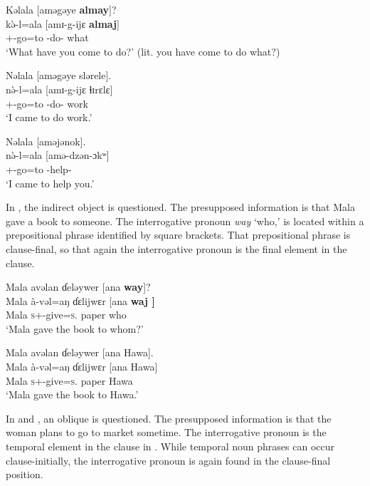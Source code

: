 \ea \label{ex:10:57}
Kəlala  [aməgəye  \textbf{almay}]?\\
\gll  k\`{ə}-l=ala   [amɪ-g-ijɛ   \textbf{almaj}]\\
      {\twoS}+{\PFV}-go=to  {\DEP}-do-{\CL}  what\\
\glt  ‘What have you come to do?’ (lit. you have come to do what?)
\z

\ea \label{ex:10:58}
Nəlala  [aməgəye  slərele].\\
\gll  n\`{ə}-l=ala     [amɪ-g-ijɛ   ɬɪrɛlɛ]\\
      {\oneS}+{\PFV}-go=to  {\DEP}-do{}-{\CL}  work\\
\glt  ‘I came to do work.’ 
\z

\clearpage
\ea \label{ex:10:59}
Nəlala  [aməjənok].\\
\gll  n\`{ə}-l=ala     [amə-dzən-ɔkʷ]\\
      {\oneS}+{\PFV}-go=to  {\DEP}-help-{\twoS}\\
\glt  ‘I came to help you.’ 
\z

In , the indirect object is questioned. The presupposed information is that Mala gave a book to someone. The interrogative pronoun \textit{way} ‘who,’ is located within a prepositional phrase identified by square brackets.  That prepositional phrase is clause-final, so that again the interrogative pronoun is the final element in the clause. 

\ea \label{ex:10:60}
Mala  avəlan  ɗeləywer  [ana  \textbf{way}]?\\
\gll  Mala   à-vəl=aŋ     ɗɛlijwɛr     [ana   \textbf{waj ]}\\
      Mala  \textsc{s}+{\PFV}-give=\textsc{s}.{\IO}  paper    {\DAT} who\\
\glt  ‘Mala gave the book to whom?’ 
\z

\ea \label{ex:10:61}
Mala  avəlan  ɗeləywer  [ana  Hawa].\\
\gll  Mala   à-vəl=aŋ     ɗɛlijwɛr     [ana   Hawa]\\
      Mala  \textsc{s}+{\PFV}-give=\textsc{s}.{\IO}  paper    {\DAT} Hawa\\
\glt  ‘Mala gave the book to Hawa.’ 
\z

In  and , an oblique is questioned. The presupposed information is that the woman plans to go to market sometime. The interrogative pronoun is the temporal element in the clause in . While temporal noun phrases can occur clause-initially, the interrogative pronoun is again found in the clause-final position. 

